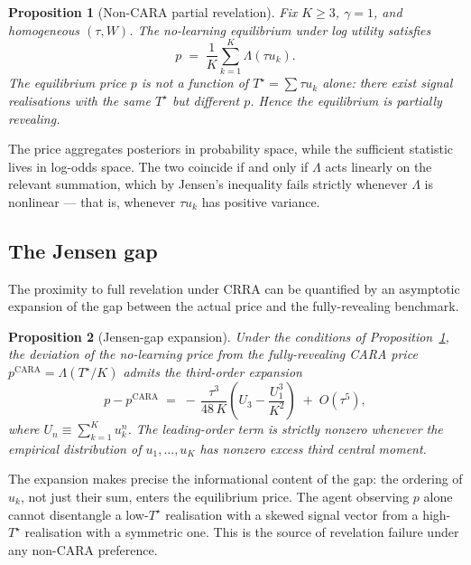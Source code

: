 \documentclass[12pt,letterpaper]{article}
\newtheorem{proposition}{Proposition}
\theoremstyle{definition}
\theoremstyle{remark}
\newcommand{\Lam}{\Lambda}            %
\newcommand{\Tstar}{T^{\!\star}}
\newcommand{\1}{\mathbf{1}}
\begin{document}
\begin{proposition}[Non-CARA partial revelation]\label{prop:non-cara}
Fix $K\geq 3$, $\gamma=1$, and homogeneous $(\tau,W)$. The no-learning
equilibrium under log utility satisfies
\begin{equation}
   p \;=\; \frac{1}{K}\sum_{k=1}^{K}\Lam(\tau u_{k}).
\label{eq:log-clearing}
\end{equation}
The equilibrium price $p$ is not a function of $\Tstar=\sum\tau u_{k}$ alone:
there exist signal realisations with the same $\Tstar$ but different $p$.
Hence the equilibrium is partially revealing.
\end{proposition}

\noindent The price aggregates posteriors in probability space, while the
sufficient statistic lives in log-odds space. The two coincide if and only
if $\Lam$ acts linearly on the relevant summation, which by Jensen's
inequality fails strictly whenever $\Lam$ is nonlinear --- that is, whenever
$\tau u_{k}$ has positive variance.

\subsection{The Jensen gap}

The proximity to full revelation under CRRA can be quantified by an
asymptotic expansion of the gap between the actual price and the
fully-revealing benchmark.

\begin{proposition}[Jensen-gap expansion]\label{prop:jensen}
Under the conditions of Proposition~\ref{prop:non-cara}, the deviation of
the no-learning price from the fully-revealing CARA price
$p^{\mathrm{CARA}}=\Lam(\Tstar/K)$ admits the third-order expansion
\begin{equation}
   p - p^{\mathrm{CARA}}
   \;=\; -\,\frac{\tau^{3}}{48\,K}\!\left(U_{3}-\frac{U_{1}^{3}}{K^{2}}\right)
   \;+\; O(\tau^{5}),
\label{eq:jensen}
\end{equation}
where $U_{n}\equiv\sum_{k=1}^{K}u_{k}^{n}$. The leading-order term is
strictly nonzero whenever the empirical distribution of $u_{1},\ldots,u_{K}$
has nonzero excess third central moment.
\end{proposition}

The expansion makes precise the informational content of the gap: the
ordering of $u_{k}$, not just their sum, enters the equilibrium price. The
agent observing $p$ alone cannot disentangle a low-$\Tstar$ realisation with
a skewed signal vector from a high-$\Tstar$ realisation with a symmetric
one. This is the source of revelation failure under any non-CARA preference.
\end{document}

